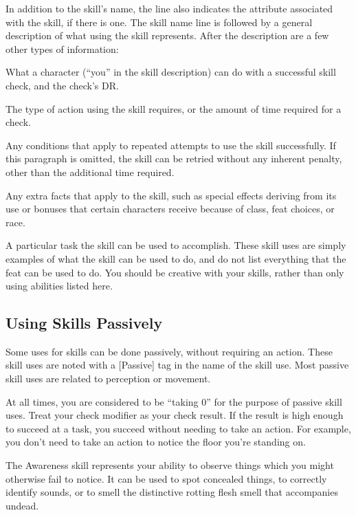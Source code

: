     In addition to the skill's name, the line also indicates the attribute associated with the skill, if there is one.
    The skill name line is followed by a general description of what using the skill represents. After the description are a few other types of information:

     What a character (``you'' in the skill description) can do with a successful skill check, and the check's DR\@.

     The type of action using the skill requires, or the amount of time required for a check.

     Any conditions that apply to repeated attempts to use the skill successfully. If this paragraph is omitted, the skill can be retried without any inherent penalty, other than the additional time required.

     Any extra facts that apply to the skill, such as special effects deriving from its use or bonuses that certain characters receive because of class, feat choices, or race.

     A particular task the skill can be used to accomplish.
    These skill uses are simply examples of what the skill can be used to do, and do not list everything that the feat can be used to do.
    You should be creative with your skills, rather than only using abilities listed here.

    \subsection{Using Skills Passively}\label{Using Skills Passively}
    Some uses for skills can be done passively, without requiring an action.
    These skill uses are noted with a [Passive] tag in the name of the skill use.
    Most passive skill uses are related to perception or movement.

    At all times, you are considered to be ``taking 0'' for the purpose of passive skill uses.
    Treat your check modifier as your check result.
    If the result is high enough to succeed at a task, you succeed without needing to take an action.
    For example, you don't need to take an action to notice the floor you're standing on.

    The Awareness skill represents your ability to observe things which you might otherwise fail to notice. It can be used to spot concealed things, to correctly identify sounds, or to smell the distinctive rotting flesh smell that accompanies undead.

